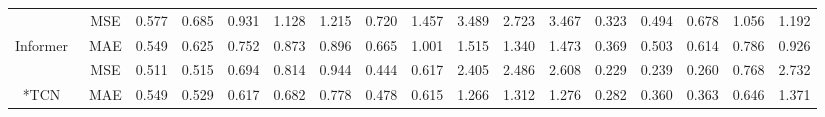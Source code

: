 \documentclass{article}
\begin{document}
\begin{table*}[htbp]
\begin{threeparttable}
{\begin{tabular}{c|c|c|c|c|c|c|c|c|c|c|c|c|c|c|c|c}
                                   & MSE                                & 0.577                        & 0.685                        & 0.931                        & 1.128                        & 1.215                        & 0.720                        & 1.457                        & 3.489                        & 2.723                        & 3.467                       & 0.323                        & 0.494                        & 0.678                        & 1.056                        & 1.192                       \\ \multirow{-2}{*}{Informer~\cite{Zhou2020InformerBE}}         & MAE                                & 0.549                        & 0.625                        & 0.752                        & 0.873                        & 0.896                        & 0.665                        & 1.001                        & 1.515                        & 1.340                        &1.473                     & 0.369                        & 0.503                        & 0.614                        & 0.786                        & 0.926                     \\ \hline
                                   & MSE                                & 0.511                                             & 0.515                                             & 0.694                                             & 0.814                                             & 0.944                                             & 0.444                                             & 0.617                                             & 2.405                                             & 2.486                                             & 2.608                                             & 0.229                                             & 0.239                                             & 0.260                                              & 0.768                                             & 2.732                         \\ \multirow{-2}{*}{*TCN~\cite{Bai2018AnEE}}              & MAE                               & 0.549                                             & 0.529                                             & 0.617                                             & 0.682                                             & 0.778                                             & 0.478                                             & 0.615                                             & 1.266                                             & 1.312                                             & 1.276                                             & 0.282                                             & 0.360                                              & 0.363                                             & 0.646                                             & 1.371                        \\ \hline

\end{tabular}}
\end{threeparttable}
\end{table*}
\end{document}

